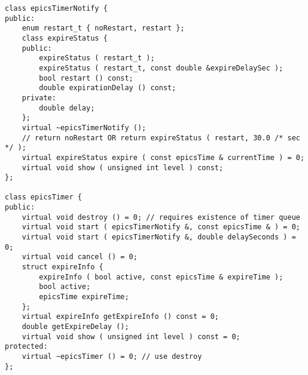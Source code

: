 \begin{verbatim}
class epicsTimerNotify {
public:
    enum restart_t { noRestart, restart };
    class expireStatus {
    public:
        expireStatus ( restart_t );
        expireStatus ( restart_t, const double &expireDelaySec );
        bool restart () const;
        double expirationDelay () const;
    private:
        double delay;
    };
    virtual ~epicsTimerNotify ();
    // return noRestart OR return expireStatus ( restart, 30.0 /* sec */ );
    virtual expireStatus expire ( const epicsTime & currentTime ) = 0;
    virtual void show ( unsigned int level ) const;
};

class epicsTimer {
public:
    virtual void destroy () = 0; // requires existence of timer queue
    virtual void start ( epicsTimerNotify &, const epicsTime & ) = 0;
    virtual void start ( epicsTimerNotify &, double delaySeconds ) = 0;
    virtual void cancel () = 0;
    struct expireInfo {
        expireInfo ( bool active, const epicsTime & expireTime );
        bool active;
        epicsTime expireTime;
    };
    virtual expireInfo getExpireInfo () const = 0;
    double getExpireDelay ();
    virtual void show ( unsigned int level ) const = 0;
protected:
    virtual ~epicsTimer () = 0; // use destroy
};
\end{verbatim}
